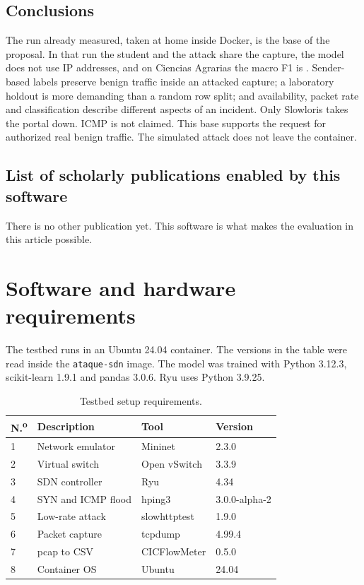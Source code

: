 \documentclass[a4paper,fleqn]{cas-dc}
\begin{document}
\subsection{Conclusions}
The run already measured, taken at home inside Docker, is the base
of the proposal. In that run the student and the attack share the
capture, the model does not use IP addresses, and on Ciencias
Agrarias the macro F1 is \Fmacro. Sender-based labels preserve benign
traffic inside an attacked capture; a laboratory holdout is more
demanding than a random row split; and availability, packet rate and
classification describe different aspects of an incident. Only
Slowloris takes the portal down. ICMP is not claimed. This base
supports the request for authorized real benign traffic. The
simulated attack does not leave the container.

\subsection{List of scholarly publications enabled by this software}
There is no other publication yet. This software is what makes the
evaluation in this article possible.

\section{Software and hardware requirements}\label{sec:requirements}

The testbed runs in an Ubuntu 24.04 container. The versions in the
table were read inside the \texttt{ataque-sdn} image. The model was
trained with Python 3.12.3, scikit-learn 1.9.1 and pandas 3.0.6.
Ryu uses Python 3.9.25.

\begin{table}[t]
\footnotesize
\caption{Testbed setup requirements.}\label{tbl:testbed}
\begin{tabular}{@{}p{0.5cm}p{2.3cm}p{1.7cm}p{1.6cm}@{}}
\toprule
N.\textsuperscript{o} & Description & Tool & Version \\
\midrule
1 & Network emulator & Mininet & 2.3.0 \\
2 & Virtual switch & Open vSwitch & 3.3.9 \\
3 & SDN controller & Ryu & 4.34 \\
4 & SYN and ICMP flood & hping3 & 3.0.0-alpha-2 \\
5 & Low-rate attack & slowhttptest & 1.9.0 \\
6 & Packet capture & tcpdump & 4.99.4 \\
7 & pcap to CSV & CICFlowMeter & 0.5.0 \\
8 & Container OS & Ubuntu & 24.04 \\
\bottomrule
\end{tabular}
\end{table}
\end{document}
